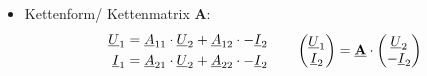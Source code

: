 \begin{itemize}[leftmargin=*]
            \item{Kettenform/ Kettenmatrix \textbf{A}:}
                \begin{align*}
                    \begin{split}
                        \underline{U}_1 &= \underline{A}_{11}\cdot\underline{U}_2 + \underline{A}_{12}\cdot-\underline{I}_2 \\
                        \underline{I}_1 &= \underline{A}_{21}\cdot\underline{U}_2 + \underline{A}_{22}\cdot-\underline{I}_2
                    \end{split}
	               \qquad
                    \begin{pmatrix}
                        \underline{U}_1 \\
                        \underline{I}_2
                    \end{pmatrix} = \textbf{\underline{A}}\cdot
                    \begin{pmatrix}
                        \underline{U}_2 \\
                        -\underline{I}_2
                    \end{pmatrix}
                \end{align*}
    \end{itemize}
   \normalsize
   
